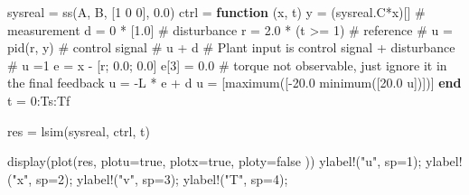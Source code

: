 \documentclass[
  8pt,
  a4paper,
]{book}
\newenvironment{Shaded}{\begin{snugshade}}{\end{snugshade}}
\newcommand{\CommentTok}[1]{\textcolor[rgb]{0.37,0.37,0.37}{#1}}
\newcommand{\ConstantTok}[1]{\textcolor[rgb]{0.56,0.35,0.01}{#1}}
\newcommand{\FloatTok}[1]{\textcolor[rgb]{0.68,0.00,0.00}{#1}}
\newcommand{\FunctionTok}[1]{\textcolor[rgb]{0.28,0.35,0.67}{#1}}
\newcommand{\KeywordTok}[1]{\textcolor[rgb]{0.00,0.23,0.31}{\textbf{#1}}}
\newcommand{\NormalTok}[1]{\textcolor[rgb]{0.00,0.23,0.31}{#1}}
\newcommand{\OperatorTok}[1]{\textcolor[rgb]{0.37,0.37,0.37}{#1}}
\newcommand{\StringTok}[1]{\textcolor[rgb]{0.13,0.47,0.30}{#1}}
\begin{document}
\begin{Shaded}
\begin{Highlighting}[]
\NormalTok{sysreal }\OperatorTok{=} \FunctionTok{ss}\NormalTok{(A, B, [}\FloatTok{1} \FloatTok{0} \FloatTok{0}\NormalTok{], }\FloatTok{0.0}\NormalTok{)}
\NormalTok{ctrl }\OperatorTok{=} \KeywordTok{function}\NormalTok{ (x, t)}
\NormalTok{    y }\OperatorTok{=}\NormalTok{ (sysreal.C}\OperatorTok{*}\NormalTok{x)[] }\CommentTok{\# measurement}
\NormalTok{    d }\OperatorTok{=} \FloatTok{0} \OperatorTok{*}\NormalTok{ [}\FloatTok{1.0}\NormalTok{]        }\CommentTok{\# disturbance}
\NormalTok{    r }\OperatorTok{=} \FloatTok{2.0} \OperatorTok{*}\NormalTok{ (t }\OperatorTok{\textgreater{}=} \FloatTok{1}\NormalTok{) }\CommentTok{\# reference}
    \CommentTok{\# u = pid(r, y) \# control signal}
    \CommentTok{\# u + d \# Plant input is control signal + disturbance}
    \CommentTok{\# u =1}
    \ConstantTok{e} \OperatorTok{=}\NormalTok{ x }\OperatorTok{{-}}\NormalTok{ [r; }\FloatTok{0.0}\NormalTok{; }\FloatTok{0.0}\NormalTok{]}
    \ConstantTok{e}\NormalTok{[}\FloatTok{3}\NormalTok{] }\OperatorTok{=} \FloatTok{0.0} \CommentTok{\# torque not observable, just ignore it in the final feedback}
\NormalTok{    u }\OperatorTok{=} \OperatorTok{{-}}\NormalTok{L }\OperatorTok{*} \ConstantTok{e} \OperatorTok{+}\NormalTok{ d}
\NormalTok{    u }\OperatorTok{=}\NormalTok{ [}\FunctionTok{maximum}\NormalTok{([}\OperatorTok{{-}}\FloatTok{20.0} \FunctionTok{minimum}\NormalTok{([}\FloatTok{20.0}\NormalTok{ u])])]}
\KeywordTok{end}
\NormalTok{t }\OperatorTok{=} \FloatTok{0}\OperatorTok{:}\NormalTok{Ts}\OperatorTok{:}\NormalTok{Tf}

\NormalTok{res }\OperatorTok{=} \FunctionTok{lsim}\NormalTok{(sysreal, ctrl, t)}

\FunctionTok{display}\NormalTok{(}\FunctionTok{plot}\NormalTok{(res, }
\NormalTok{    plotu}\OperatorTok{=}\ConstantTok{true}\NormalTok{, }
\NormalTok{    plotx}\OperatorTok{=}\ConstantTok{true}\NormalTok{, }
\NormalTok{    ploty}\OperatorTok{=}\ConstantTok{false}
\NormalTok{    ))}
\FunctionTok{ylabel!}\NormalTok{(}\StringTok{"u"}\NormalTok{, sp}\OperatorTok{=}\FloatTok{1}\NormalTok{);}
\FunctionTok{ylabel!}\NormalTok{(}\StringTok{"x"}\NormalTok{, sp}\OperatorTok{=}\FloatTok{2}\NormalTok{);}
\FunctionTok{ylabel!}\NormalTok{(}\StringTok{"v"}\NormalTok{, sp}\OperatorTok{=}\FloatTok{3}\NormalTok{);}
\FunctionTok{ylabel!}\NormalTok{(}\StringTok{"T"}\NormalTok{, sp}\OperatorTok{=}\FloatTok{4}\NormalTok{);}
\end{Highlighting}
\end{Shaded}
\end{document}

